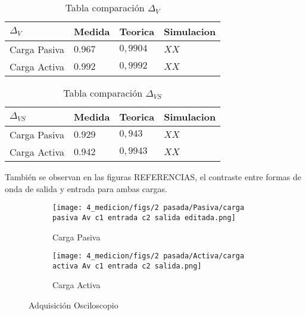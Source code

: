 \begin{table}[ht]
    \centering
    \begin{tabular}{|l|l|l|l|}
    \hline
    $\Delta_V $  & Medida   & Teorica  & Simulacion \\ \hline
    Carga Pasiva & $0.967$  & $0,9904$ &  $XX$       \\ \hline
    Carga Activa & $0.992$  & $0,9992$ &  $XX$          \\ \hline
    \end{tabular}
    \caption{Tabla comparación $\Delta_V$}\label{table:comp av}
\end{table}

\begin{table}[ht]
    \centering
    \begin{tabular}{|l|l|l|l|}
    \hline
    $\Delta_{VS} $  & Medida   & Teorica  & Simulacion \\ \hline
    Carga Pasiva & $0.929$  & $0,943$ &  $XX$       \\ \hline
    Carga Activa & $0.942$  & $0,9943$ &  $XX$          \\ \hline
    \end{tabular}
    \caption{Tabla comparación $\Delta_{VS}$}\label{table:comp avs}
\end{table}
También se observan en las figuras REFERENCIAS, el contraste entre formas de onda de salida y entrada para ambas cargas.



\begin{figure}[ht]
\begin{subfigure}{.45\textwidth}
  \centering
  \texttt{[image: 4\_medicion/figs/2 pasada/Pasiva/carga pasiva Av c1 entrada c2 salida editada.png]}  
  \caption{Carga Pasiva}
  \label{fig:Av carga pasiva}
\end{subfigure}
\begin{subfigure}{.45\textwidth}
  \centering
  \texttt{[image: 4\_medicion/figs/2 pasada/Activa/carga activa Av c1 entrada c2 salida.png]}  
  \caption{Carga Activa}
  \label{fig:Av carga activa}
\end{subfigure}
\caption{Adquisición Osciloscopio}
\label{fig:Av oscilo}
\end{figure}

